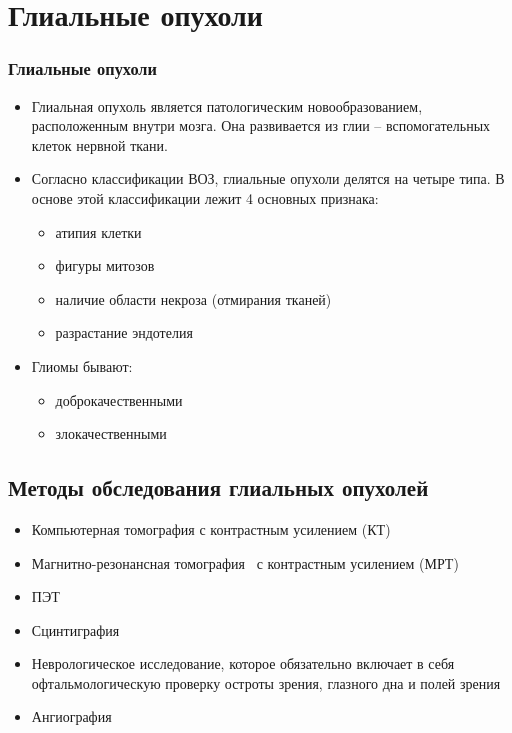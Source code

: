 
\section{Глиальные опухоли}

\begin{frame}
  \frametitle{Глиальные опухоли}

  \begin{itemize}
  \item
  Глиальная опухоль является патологическим новообразованием, расположенным внутри мозга. 
  Она развивается из глии – вспомогательных клеток нервной ткани.
  
  \item
  Согласно классификации ВОЗ, глиальные опухоли делятся на четыре типа. В основе этой классификации лежит 4 основных признака:
    \begin{itemize}
      \item атипия клетки
      \item фигуры митозов
      \item наличие области некроза (отмирания тканей)
      \item разрастание эндотелия
    \end{itemize}
    
  \item Глиомы бывают:
    \begin{itemize}
      \item доброкачественными
      \item злокачественными
    \end{itemize}
     
  \end{itemize}
\end{frame}

\subsection{Методы обследования глиальных опухолей}

\begin{frame}
  \begin{itemize}
    \frametitle{Методы обследования глиальных опухолей}
    \item Компьютерная томография с контрастным усилением (КТ)
    \item Магнитно-резонансная томография  с контрастным усилением (МРТ)
    \item ПЭТ 
    \item Сцинтиграфия
    \item Неврологическое исследование, которое обязательно включает в себя офтальмологическую проверку остроты зрения, глазного дна и полей зрения
    \item Ангиография
  \end{itemize}
\end{frame}